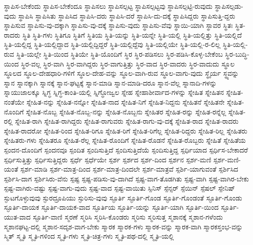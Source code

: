 {ಸ್ಥಾಪಿಸ-ಬೇಕೆಂದು
ಸ್ಥಾಪಿಸ-ಬೇಕೆಂದೂ
ಸ್ಥಾಪಿಸಲು
ಸ್ಥಾಪಿಸಲ್ಪಟ್ಟ
ಸ್ಥಾಪಿಸಲ್ಪಟ್ಟವು
ಸ್ಥಾಪಿಸಲ್ಪಟ್ಟಿ-ರುವುದು
ಸ್ಥಾಪಿಸಲ್ಪಡು-ವುದು
ಸ್ಥಾಪಿಸಿ
ಸ್ಥಾಪಿಸಿತು
ಸ್ಥಾಪಿಸಿದ
ಸ್ಥಾಪಿಸಿ-ದರು
ಸ್ಥಾಪಿಸಿ-ದರೆ
ಸ್ಥಾಪಿಸಿ-ದು-ದಕ್ಕೆ
ಸ್ಥಾಪಿಸಿದ್ದರು
ಸ್ಥಾಪಿಸುತ್ತಿ-ದ್ದರು
ಸ್ಥಾಪಿಸುವ
ಸ್ಥಾಪಿಸು-ವು-ದಕ್ಕಾಗಿ
ಸ್ಥಾಪಿಸು-ವು-ದಕ್ಕೆ
ಸ್ಥಾಪಿಸು-ವುದು
ಸ್ಥಾಪಿಸು-ವೆವು
ಸ್ಥಾಯಿ-ಯಾಗಿ
ಸ್ಥಾವರ
ಸ್ಥಿತಃ
ಸ್ಥಿತ-ರಾದರು
ಸ್ಥಿತಿ
ಸ್ಥಿತಿ-ಗಳು
ಸ್ಥಿತಿಗೂ
ಸ್ಥಿತಿಗೆ
ಸ್ಥಿತಿಯ
ಸ್ಥಿತಿ-ಯನ್ನು
ಸ್ಥಿತಿ-ಯನ್ನೇ
ಸ್ಥಿತಿ-ಯಲ್ಲಿ
ಸ್ಥಿತಿ-ಯಲ್ಲಿತ್ತು
ಸ್ಥಿತಿ-ಯಲ್ಲಿದೆ
ಸ್ಥಿತಿ-ಯಲ್ಲಿದ್ದ
ಸ್ಥಿತಿ-ಯಲ್ಲಿದ್ದಾದ
ಸ್ಥಿತಿ-ಯಲ್ಲಿದ್ದಿದ್ದರೆ
ಸ್ಥಿತಿ-ಯಲ್ಲಿದ್ದೆವು
ಸ್ಥಿತಿ-ಯಲ್ಲಿಯೇ
ಸ್ಥಿತಿ-ಯಲ್ಲಿ-ರ-ಲಿಲ್ಲ
ಸ್ಥಿತಿ-ಯಲ್ಲಿ-ರುವ
ಸ್ಥಿತಿ-ಯಲ್ಲೇ
ಸ್ಥಿತಿ-ಯಿಂದ
ಸ್ಥಿತಿಯೇ
ಸ್ಥಿತಿ-ಯೊಂದಿಗೆ
ಸ್ಥಿರ
ಸ್ಥಿರ-ಪಡಿಸಲು
ಸ್ಥಿರ-ಪಡಿಸಿ-ಕೊಳ್ಳ-ಬೇಕೆಂಬ
ಸ್ಥಿರ-ಬುದ್ಧಿ-ಯಿಂದ
ಸ್ಥಿರ-ವಲ್ಲ
ಸ್ಥಿರ-ವಾಗಿ
ಸ್ಥಿರ-ವಾಗಿದ್ದರು
ಸ್ಥಿರ-ವಾಗುತ್ತಿತ್ತು
ಸ್ಥಿರ-ವಾದ
ಸ್ಥಿರ-ವಾದರು
ಸ್ಥಿರ-ವಾದುದು
ಸ್ಥೂಲ
ಸ್ಥೂಲದ
ಸ್ಥೂಲ-ದೇಹಧಾರಿ-ಗಳಿಗೆ
ಸ್ಥೂಲ-ದೇಹ-ವನ್ನು
ಸ್ಥೂಲ-ವಾಗಿ-ರುವ
ಸ್ಥೂಲ-ವಾಗು-ವುದು
ಸ್ಥೈರ್ಯ
ಸ್ಥ್ಯವನ್ನು
ಸ್ನಾನ
ಸ್ನಾನಕ್ಕಾಗಿ
ಸ್ನಾನಕ್ಕೆ
ಸ್ನಾನ-ಘಟ್ಟಕ್ಕೆ
ಸ್ನಾನ-ಮಾಡಿ
ಸ್ನಾನ-ಮಾಡಿ-ದರೂ
ಸ್ನಾನ-ವೆಲ್ಲ
ಸ್ನಾನಾದಿ-ಗಳನ್ನು
ಸ್ನಾಯುಜಾಲಕ್ಕೂ
ಸ್ನಿಗ್ಧ
ಸ್ನಿಗ್ಧ-ಕಾಂತಿ-ಯಲ್ಲಿ
ಸ್ನಿಗ್ಧೋಜ್ವಲ
ಸ್ನೇಹ
ಸ್ನೇಹಾಶೀರ್ವಾದ-ಗಳನ್ನು
ಸ್ನೇಹಿತ
ಸ್ನೇಹಿತನ
ಸ್ನೇಹಿತ-ನಂತೆಯೇ
ಸ್ನೇಹಿತ-ನನ್ನು
ಸ್ನೇಹಿತ-ನನ್ನೋ
ಸ್ನೇಹಿತ-ನಾದ
ಸ್ನೇಹಿತ-ನಿಗೆ
ಸ್ನೇಹಿತ-ನಿದ್ದನು
ಸ್ನೇಹಿತನೆ
ಸ್ನೇಹಿತನೇ
ಸ್ನೇಹಿತ-ನೊಂದಿಗೆ
ಸ್ನೇಹಿತ-ನೊಬ್ಬ
ಸ್ನೇಹಿತ-ನೊಬ್ಬ-ನನ್ನು
ಸ್ನೇಹಿತ-ನೊಬ್ಬನು
ಸ್ನೇಹಿತರ
ಸ್ನೇಹಿತ-ರನ್ನು
ಸ್ನೇಹಿತ-ರನ್ನೆಲ್ಲ
ಸ್ನೇಹಿತ-ರಲ್ಲಿ
ಸ್ನೇಹಿತ-ರಾಗಿ
ಸ್ನೇಹಿತ-ರಾಗಿದ್ದರು
ಸ್ನೇಹಿತ-ರಾಗುವರು
ಸ್ನೇಹಿತ-ರಾಗು-ವು-ದಕ್ಕೆ
ಸ್ನೇಹಿತ-ರಾದ
ಸ್ನೇಹಿತ-ರಾದರು
ಸ್ನೇಹಿತ-ರಾದರೋ
ಸ್ನೇಹಿತ-ರಿಂದ
ಸ್ನೇಹಿತ-ರಿಗೂ
ಸ್ನೇಹಿತ-ರಿಗೆ
ಸ್ನೇಹಿತ-ರಿಗೆಲ್ಲ
ಸ್ನೇಹಿತ-ರಿದ್ದರು
ಸ್ನೇಹಿತ-ರಿಲ್ಲ
ಸ್ನೇಹಿತರು
ಸ್ನೇಹಿತರು-ಗಳು
ಸ್ನೇಹಿತರೂ
ಸ್ನೇಹಿತ-ರೆಲ್ಲ
ಸ್ನೇಹಿತ-ರೊಂದಿಗೆ
ಸ್ನೇಹಿತ-ರೊಡನೆ
ಸ್ನೇಹಿತ-ರೊಬ್ಬರು
ಸ್ನೇಹಿತೆ
ಸ್ನೇಹಿತೆಯ
ಸ್ಪಂದನ-ದೊಂದಿಗೆ
ಸ್ಪಂದನವೂ
ಸ್ಪಂದಿತ
ಸ್ಪಂದಿಸುತ್ತಿದೆ
ಸ್ಪಂದಿಸುತ್ತಿದೆಯೆ
ಸ್ಪಂದಿಸುತ್ತಿದ್ದ
ಸ್ಪರ್ಧಿಯಾದ
ಸ್ಪರ್ಧಿಸ-ಬೇಕಾದರೆ
ಸ್ಪರ್ಧಿಸುತ್ತಿತ್ತು
ಸ್ಪರ್ಧಿಸುತ್ತಿದ್ದರು
ಸ್ಪರ್ಧೆ
ಸ್ಪರ್ಧೆಯೇ
ಸ್ಪರ್ಶ
ಸ್ಪರ್ಶದ
ಸ್ಪರ್ಶ-ದಿಂದ
ಸ್ಪರ್ಶನ
ಸ್ಪರ್ಶ-ಮಣಿ
ಸ್ಪರ್ಶ-ಮಣಿ-ಯಂತೆ
ಸ್ಪರ್ಶ-ಮಾಡಿ
ಸ್ಪರ್ಶ-ಮಾತ್ರ-ದಿಂದ
ಸ್ಪರ್ಶ-ಮಾತ್ರ-ದಿಂದಲೇ
ಸ್ಪರ್ಶ-ಮಾತ್ರವೆ
ಸ್ಪರ್ಶಿ-ಯಾಗುವಂತೆ
ಸ್ಪರ್ಶಿಸಿದ
ಸ್ಪರ್ಶಿಸಿ-ದಾಗ
ಸ್ಪರ್ಶಿಸಿರು-ವೆನು
ಸ್ಪಷ್ಟ
ಸ್ಪಷ್ಟ-ಪಡಿಸು-ವು-ದಾಗಿದೆ
ಸ್ಪಷ್ಟ-ವಾಗ-ತೊಡಗಿತು
ಸ್ಪಷ್ಟ-ವಾಗಿ
ಸ್ಪಷ್ಟ-ವಾಗಿರ-ಬೇಕು
ಸ್ಪಷ್ಟ-ವಾಗಿರು-ವಷ್ಟು
ಸ್ಪಷ್ಟ-ವಾಗು-ವುದು
ಸ್ಪಷ್ಟ-ವಾದ
ಸ್ಪಷ್ಟ-ವಾಯಿತು
ಸ್ಪಿನಿಸ್
ಸ್ಪೆನ್ಸರ್
ಸ್ಪೆಯಿನ್
ಸ್ಪೆಷಲ್
ಸ್ಪೇನಿಷ್
ಸ್ಫುಟಗೊಳ್ಳುವುವು
ಸ್ಫುರದ್ರೂಪಿಯು
ಸ್ಫುರಿಸು-ವುವು
ಸ್ಫೂರ್ತಿ
ಸ್ಫೂರ್ತಿ-ಗೊಂಡ
ಸ್ಫೂರ್ತಿ-ಗೊಂಡಂತೆ
ಸ್ಫೂರ್ತಿ-ಗೊಂಡು
ಸ್ಫೂರ್ತಿ-ದಾಯಕ
ಸ್ಫೂರ್ತಿ-ದಾಯಕ-ವಾದ
ಸ್ಫೂರ್ತಿಯ
ಸ್ಫೂರ್ತಿ-ಯನ್ನು
ಸ್ಫೂರ್ತಿ-ಯಾಗಿ
ಸ್ಫೂರ್ತಿ-ಯಿಂದ
ಸ್ಫೂರ್ತಿ-ಯುತ-ವಾದ
ಸ್ಫೂರ್ತಿ-ವಾಣಿ
ಸ್ಮರಣೆ
ಸ್ಮರಿಸಿ
ಸ್ಮರಿಸಿ-ಕೊಂಡರು
ಸ್ಮರಿಸು
ಸ್ಮರಿಸುತ್ತ
ಸ್ಮಶಾನಕ್ಕೆ
ಸ್ಮಶಾನ-ಗಳೆಂದು
ಸ್ಮಶಾನಘಟ್ಟ-ದಲ್ಲಿ
ಸ್ಮಶಾನ-ಸದೃಶ-ವಾಗ-ಬೇಕು
ಸ್ಮಾರಕ
ಸ್ಮಾರಕ-ಗಳು
ಸ್ಮಾರಕ-ವನ್ನು
ಸ್ಮಾರಕ-ವಾಗಿ
ಸ್ಮಾರಕಸ್ತಂಭ-ವನ್ನು
ಸ್ಮಿತ್
ಸ್ಮೃತಿ
ಸ್ಮೃತಿ-ಗಳಿಂದ
ಸ್ಮೃತಿ-ಗಳು
ಸ್ಮೃತಿ-ಚಿತ್ರ-ಗಳು
ಸ್ಮೃತಿ-ಪಥ-ದಲ್ಲಿ
ಸ್ಮೃತಿ-ಯಲ್ಲಿ
}
